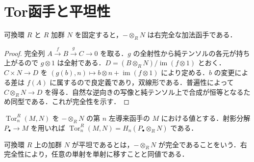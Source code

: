 \section{Tor函手と平坦性}
\begin{prop}[テンソル積の右完全性]
可換環 $R$ と $R$ 加群 $N$ を固定すると，$-\otimes_R N$ は右完全な加法函手である．
\end{prop}
\begin{proof}
完全列 $A\xrightarrow{f}B\xrightarrow{g}C\to0$ を取る．$g$ の全射性から純テンソルの各元が持ち上がるので $g\otimes1$ は全射である．$D=(B\otimes_R N)/\operatorname{im}(f\otimes1)$ とおく．$C\times N\to D$ を $(g(b),n)\mapsto b\otimes n+\operatorname{im}(f\otimes1)$ により定める．$b$ の変更による差は $f(A)$ に属するので良定義であり，双線形である．普遍性によって $C\otimes_R N\to D$ を得る．自然な逆向きの写像と純テンソル上で合成が恒等となるため同型である．これが完全性を示す．
\end{proof}
\begin{defn}[Tor函手]
$\operatorname{Tor}_n^R(M,N)$ を $-\otimes_R N$ の第 $n$ 左導来函手の $M$ における値とする．射影分解 $P_\bullet\to M$ を用いれば $\operatorname{Tor}_n^R(M,N)=H_n(P_\bullet\otimes_R N)$ である．
\end{defn}
\begin{defn}[平坦加群]
可換環 $R$ 上の加群 $N$ が平坦であるとは，$-\otimes_R N$ が完全であることをいう．右完全性により，任意の単射を単射に移すことと同値である．
\end{defn}

